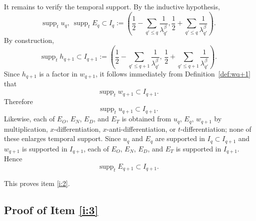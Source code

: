 \documentclass[12pt,reqno,letterpaper]{amsart}
\numberwithin{equation}{section}
\newcommand{\1}{{\bf 1}}
\newcommand{\2}{{\bf 2}}
\theoremstyle{remark}
\theoremstyle{remark}
\begin{document}

It remains to verify the temporal support. By the inductive hypothesis,
\[
\operatorname{supp}_t u_q,\ \operatorname{supp}_t E_q \subset I_q :=
\left(\frac12-\sum_{q'\le q}\frac1{\lambda_{q'}^\beta}, \frac12+\sum_{q'\le q}\frac1{\lambda_{q'}^\beta}\right).
\]
By construction,
\[
\operatorname{supp}_t h_{q+1}\subset
I_{q+1} := \left(\frac12-\sum_{q'\le q+1}\frac1{\lambda_{q'}^\beta},\, \frac12+\sum_{q'\le q+1}\frac1{\lambda_{q'}^\beta}\right).
\]
Since $h_{q+1}$ is a factor in $w_{q+1}$, it follows immediately from Definition~\ref{def:wq+1} that
\[
\operatorname{supp}_t w_{q+1}\subset I_{q+1}.
\]
Therefore
\[
\operatorname{supp}_t u_{q+1}\subset I_{q+1}.
\]
Likewise, each of $E_O$, $E_N$, $E_D$, and $E_T$ is obtained from $u_q$, $E_q$, $w_{q+1}$ by multiplication, $x$-differentiation, $x$-anti-differentiation, or $t$-differentiation; none of these enlarges temporal support. Since $u_q$ and $E_q$ are supported in $I_q\subset I_{q+1}$ and $w_{q+1}$ is supported in $I_{q+1}$, each of $E_O$, $E_N$, $E_D$, and $E_T$ is supported in $I_{q+1}$. Hence
\[
\operatorname{supp}_t E_{q+1}\subset I_{q+1}.
\]

This proves item \ref{i:2}.








\subsection{Proof of Item \ref{i:3}}
\end{document}
